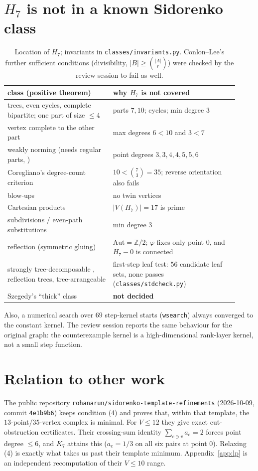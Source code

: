 \documentclass[11pt]{amsart}
\theoremstyle{definition}
\theoremstyle{remark}
\newcommand{\1}{\mathbf 1}
\begin{document}
\section{$H_7$ is not in a known Sidorenko class}
\begin{table}[h]\small
\begin{tabular}{p{0.42\linewidth}p{0.5\linewidth}}
\toprule
class (positive theorem) & why $H_7$ is not covered\\
\midrule
trees, even cycles, complete bipartite; one part of size $\le4$ \cite{sidorenko1991} & parts $7,10$; cycles; min degree $3$\\
vertex complete to the other part \cite{cfs2010} & max degrees $6<10$ and $3<7$\\
weakly norming (needs regular parts, \cite{hatami2010}) & point degrees $3,3,4,4,5,5,6$\\
Coregliano's degree-count criterion \cite{coregliano2024} & $10<\binom73=35$; reverse orientation also fails\\
blow-ups \cite{conlonlee2021} & no twin vertices\\
Cartesian products & $|V(H_7)|=17$ is prime\\
subdivisions / even-path substitutions & min degree $3$\\
reflection (symmetric gluing) & $\mathrm{Aut}=\mathbb Z/2$; $\varphi$ fixes only point $0$, and $H_7-0$ is connected\\
strongly tree-decomposable \cite{cklee2018}, reflection trees, tree-arrangeable & first-step leaf test: $56$ candidate leaf sets, none passes (\texttt{classes/stdcheck.py})\\
Szegedy's ``thick'' class & \textbf{not decided}\\
\bottomrule
\end{tabular}
\caption{Location of $H_7$; invariants in \texttt{classes/invariants.py}. Conlon--Lee's further sufficient
conditions (divisibility, $|B|\ge\binom{|A|}{r}$) were checked by the review session to fail as well.}
\end{table}
Also, a numerical search over $69$ step-kernel starts (\texttt{wsearch}) always converged to the constant kernel.
The review session reports the same behaviour for the original graph: the counterexample kernel is a high-dimensional rank-layer kernel, not a small step function.

\section{Relation to other work}
The public repository \texttt{rohanarun/sidorenko-template-refinements} (2026-10-09, commit \texttt{4e1b9b6})
keeps condition (4) and proves that, within that template, the $13$-point/$35$-vertex complex is minimal.
For $V\le12$ they give exact cut-obstruction certificates. Their crossing-sum identity
$\sum_{e\ni v}a_e=2$ forces point degree $\le6$, and $K_7$ attains this ($a_e=1/3$ on all six pairs at point $0$).
Relaxing (4) is exactly what takes us past their template minimum. Appendix~\ref{app:lp} is an
independent recomputation of their $V\le10$ range.
\end{document}
